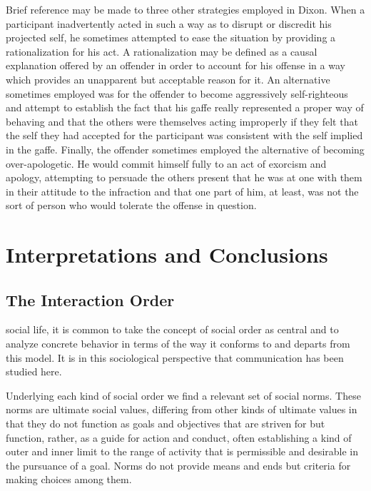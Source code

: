 \documentclass[openany,nobib]{tufte-book}
\let\oldchapter\chapter
\def\chapter{%
  \setcounter{footnote}{0}%
  \oldchapter
}
\begin{document}
Brief reference may be made to three other strategies employed in Dixon.
When a participant inadvertently acted in such a way as to disrupt or
discredit his projected self, he sometimes attempted to ease the
situation by providing a rationalization for his act. A rationalization
may be defined as a causal explanation offered by an offender in order
to account for his offense in a way which provides an unapparent but
acceptable reason for it. An alternative sometimes employed was for the
offender to become aggressively self-righteous and attempt to establish
the fact that his gaffe really represented a proper way of behaving and
that the others were themselves acting improperly if they felt that the
self they had accepted for the participant was consistent with the self
implied in the gaffe. Finally, the offender sometimes employed the
alternative of becoming over-apologetic. He would commit himself fully
to an act of exorcism and apology, attempting to persuade the others
present that he was at one with them in their attitude to the infraction
and that one part of him, at least, was not the sort of person who would
tolerate the offense in question.

\chapter[INTERPRETATIONS AND CONCLUSIONS]{Interpretations and Conclusions}
\label{ch:Interpretations and Conclusions}

\hypertarget{the-interaction-order}{%
\section{The Interaction Order}\label{the-interaction-order}}

social life, it is common to take the concept of social
order as central and to analyze concrete behavior in terms of the way it
conforms to and departs from this model. It is in this sociological
perspective that communication has been studied here.

Underlying each kind of social order we find a relevant set of social
norms. These norms are ultimate social values, differing from other
kinds of ultimate values in that they do not function as goals and
objectives that are striven for but function, rather, as a guide for
action and conduct, often establishing a kind of outer and inner limit
to the range of activity that is permissible and desirable in the
pursuance of a goal. Norms do not provide means and ends but criteria
for making choices among them.
\end{document}
